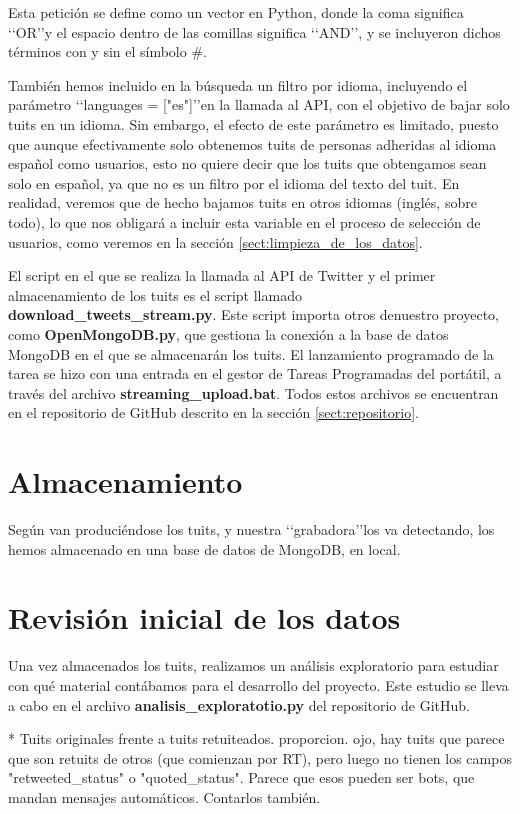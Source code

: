 Esta petición se define como un vector en Python, donde la coma significa \lq\lq OR\rq\rq y el espacio
dentro de las comillas significa \lq\lq AND\rq\rq, y se incluyeron dichos términos con y sin el símbolo
\#.

También hemos incluido en la búsqueda un filtro por idioma, incluyendo el parámetro 
\lq\lq languages = ["es"]\rq\rq en la llamada al API, con el objetivo de bajar solo tuits
en un idioma. Sin embargo, el efecto de este parámetro es limitado, puesto que aunque efectivamente
solo obtenemos tuits de personas adheridas al idioma español como usuarios, esto no quiere decir
que los tuits que obtengamos sean solo en español, ya que no es un filtro por el idioma del texto del tuit.
En realidad, veremos que de hecho bajamos tuits en otros idiomas (inglés, sobre todo), lo que
nos obligará a incluir esta variable en el proceso de selección de usuarios, como veremos en la sección 
\ref{sect:limpieza_de_los_datos}.

El script en el que se realiza la llamada al API de Twitter y el primer almacenamiento de los tuits
es el script llamado {\bf download\_tweets\_stream.py}. Este script importa otros
denuestro proyecto, como {\bf OpenMongoDB.py}, que gestiona la conexión a la base de datos MongoDB
en el que se almacenarán los tuits. El lanzamiento programado de la tarea se hizo con una entrada en el gestor
de Tareas Programadas del portátil, a través del archivo {\bf streaming\_upload.bat}. Todos estos
archivos se encuentran en el repositorio de GitHub descrito en la sección \ref{sect:repositorio}.


\section{Almacenamiento}
Según van produciéndose los tuits, y nuestra \lq\lq grabadora\rq\rq los va detectando, los hemos almacenado
en una base de datos de MongoDB, en local.


\section{Revisión inicial de los datos}
Una vez almacenados los tuits, realizamos un análisis exploratorio para estudiar con qué material contábamos para el desarrollo del proyecto. Este estudio se lleva a cabo en el archivo {\bf analisis\_exploratotio.py} del repositorio de
GitHub.

* Tuits originales frente a tuits retuiteados. proporcion.
ojo, hay tuits que parece que son retuits de otros (que comienzan por RT), pero luego
no tienen los campos "retweeted\_status" o "quoted\_status". Parece que esos pueden ser bots, que 
mandan mensajes automáticos. Contarlos también.

